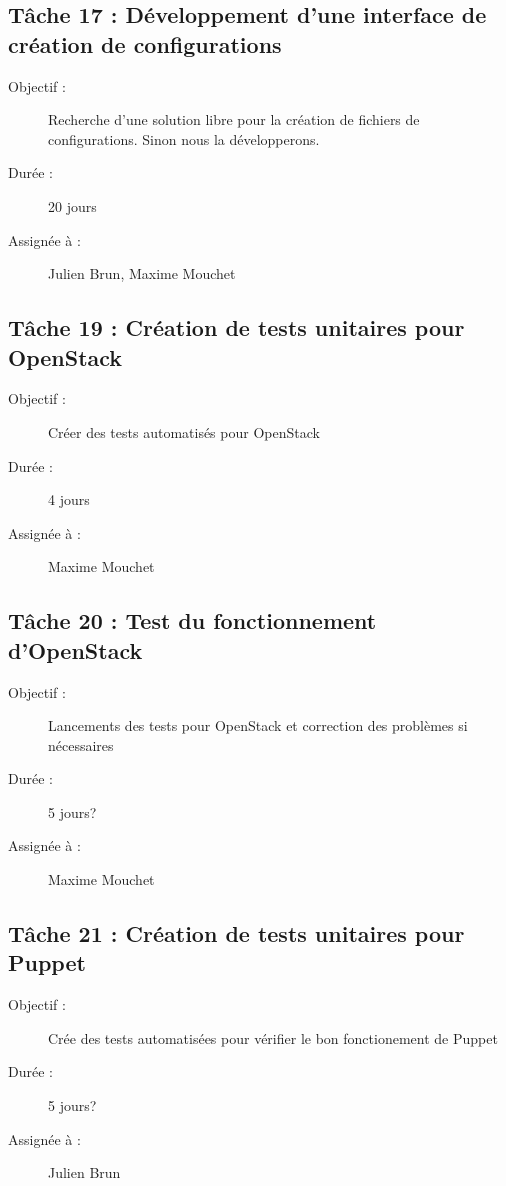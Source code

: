 \subsection*{Tâche 17 : Développement d'une interface de création de configurations}
\begin{description}
\item[Objectif :] Recherche d'une solution libre pour la création de fichiers de configurations. Sinon nous la développerons.
\item[Durée :]  20 jours
\item[Assignée à :] Julien Brun, Maxime Mouchet
\end{description}

\subsection*{Tâche 19 : Création de tests unitaires pour OpenStack}
\begin{description}
\item[Objectif :] Créer des tests automatisés pour OpenStack
\item[Durée :]  4 jours
\item[Assignée à :] Maxime Mouchet
\end{description}

\subsection*{Tâche 20 : Test du fonctionnement d'OpenStack}
\begin{description}
\item[Objectif :] Lancements des tests pour OpenStack et correction des problèmes si nécessaires
\item[Durée :]  5 jours?
\item[Assignée à :] Maxime Mouchet
\end{description}

\subsection*{Tâche 21 : Création de tests unitaires pour Puppet}
\begin{description}
\item[Objectif :] Crée des tests automatisées pour vérifier le bon fonctionement de Puppet
\item[Durée :]  5 jours?
\item[Assignée à :] Julien Brun
\end{description}

